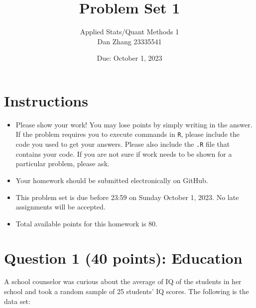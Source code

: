 \documentclass[12pt,letterpaper]{article}
\title{Problem Set 1}
\date{Due: October 1, 2023}
\author{Applied Stats/Quant Methods 1 \\ Dan Zhang 23335541}
\begin{document}
	\maketitle
	
	\section*{Instructions}
	\begin{itemize}
	\item Please show your work! You may lose points by simply writing in the answer. If the problem requires you to execute commands in \texttt{R}, please include the code you used to get your answers. Please also include the \texttt{.R} file that contains your code. If you are not sure if work needs to be shown for a particular problem, please ask.
\item Your homework should be submitted electronically on GitHub.
\item This problem set is due before 23:59 on Sunday October 1, 2023. No late assignments will be accepted.
\item Total available points for this homework is 80.
	\end{itemize}
	
	\vspace{1cm}
	\section*{Question 1 (40 points): Education}

A school counselor was curious about the average of IQ of the students in her school and took a random sample of 25 students' IQ scores. The following is the data set:\\
\vspace{.5cm}

  

\vspace{.5cm}
\end{document}
